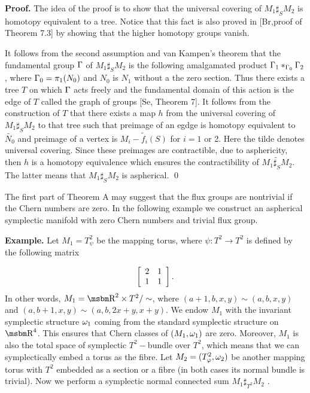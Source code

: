 \bigskip

{\bf Proof.} The idea of the proof is to show that
the universal covering of  $M_1\sharp _SM_2$ is homotopy
equivalent to a tree. Notice that this fact
is also proved in [Br,proof of Theorem 7.3] by
showing that the higher homotopy groups vanish.

It follows from the second assumption
and van Kampen's theorem
that the fundamental group $\Gamma $ of  $M_1\sharp _SM_2$ is
the following amalgamated product $\Gamma _1*_{\Gamma _0}\Gamma _2$,
where $\Gamma _0=\pi _1(N_0) $ and $N_0$ is $N_1$ without a the
zero section.
Thus there exists a tree $T$ on which $\Gamma $ acts freely
and the fundamental domain of this action is the edge of $T$ 
called the graph
of groups  [Se, Theorem 7]. It follows
from the construction of $T$ that there exists a map $h$
from the universal covering of  $M_1\sharp _SM_2$ to that
tree such that preimage of an egdge is homotopy equivalent
to $\tilde {N_0}$ and preimage of a vertex
is  $\widetilde {M_i-f_i(S)}$ for $i=1$ or 2. Here the tilde
denotes universal covering. Since these preimages
are contractible, due to asphericity, then $h$ is
a homotopy equivalence which ensures the contractibility
of $\widetilde { M_1\sharp _SM_2}$. The latter means that
 $M_1\sharp _SM_2$ is aspherical. 
\qed

\bigskip
The first part of Theorem A may suggest that the flux groups
are nontrivial if the Chern numbers are zero.
In the following example we construct an aspherical symplectic
manifold with zero Chern numbers and trivial flux group.


\bigskip
{\bf Example.}
 Let $M_1=T^2_{\psi }$ be the mapping torus, where $\psi :T^2\to T^2$
is defined by the following matrix

$$
\left [ \begin{array}{cc} 2 & 1 \\ 1 & 1 \\ \end{array} \right ].
$$
In other words, $M_1=\B R^2\times T^2/\sim $, where
$(a+1,b,x,y)\sim (a,b,x,y)$ and $(a,b+1,x,y)\sim (a,b,2x+y,x+y)$.
We endow $M_1$ with the invariant symplectic structure $\omega _1$ coming
from the standard symplectic structure on $\B R^4$. This
ensures that Chern classes of $(M_1,\omega _1)$ are zero. Moreover, $M_1$ is also
the total space of symplectic $T^2-$bundle over $T^2$, which
means that we can symplectically embed a torus as the fibre.
Let $M_2 = (T^2_{\varphi}, \omega _2)$ be another mapping torus
with $T^2$ embedded as a section or a fibre
(in both cases its normal bundle is trivial). Now we perform
a symplectic normal connected sum $M_1\sharp _{T^2}M_2$ \cite{gom,mw}.




